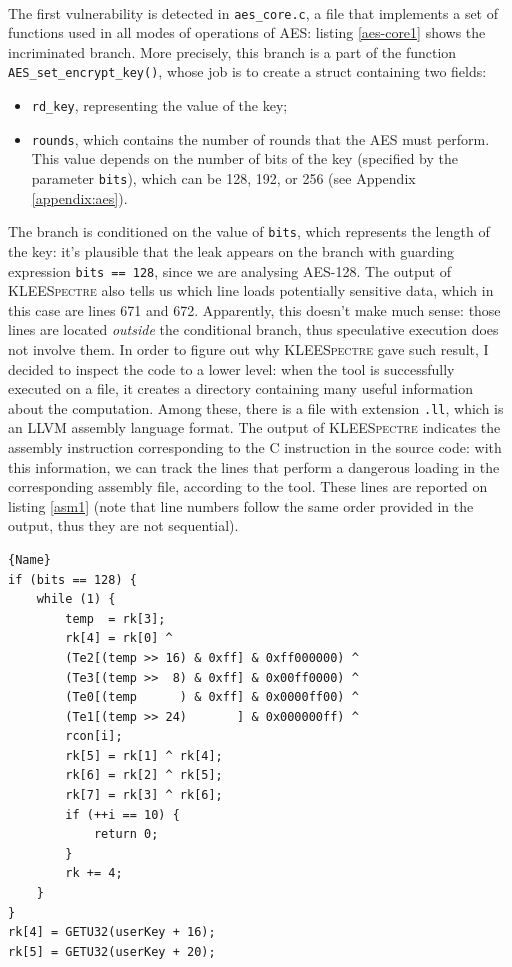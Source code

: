 \documentclass[12pt,a4paper]{book}
\theoremstyle{definition}
\begin{document}
	\paragraph{} The first vulnerability is detected in \texttt{aes\_core.c}, a file that implements a set of functions used in all modes of operations of AES: listing \ref{aes-core1} shows the incriminated branch. More precisely, this branch is a part of the function \texttt{AES\_set\_encrypt\_key()}, whose job is to create a struct containing two fields:
	\begin{itemize}
		\item \texttt{rd\_key}, representing the value of the key;
		\item \texttt{rounds}, which contains the number of rounds that the AES must perform. This value depends on the number of bits of the key (specified by the parameter \texttt{bits}), which can be 128, 192, or 256 (see Appendix \ref{appendix:aes}). 
	\end{itemize}
	The branch is conditioned on the value of \texttt{bits}, which represents the length of the key: it's plausible that the leak appears on the branch with guarding expression \texttt{bits == 128}, since we are analysing AES-128. The output of \textsc{KLEESpectre} also tells us which line loads potentially sensitive data, which in this case are lines 671 and 672. Apparently, this doesn't make much sense: those lines are located \textit{outside} the conditional branch, thus speculative execution does not involve them. In order to figure out why \textsc{KLEESpectre} gave such result, I decided to inspect the code to a lower level: when the tool is successfully executed on a file, it creates a directory containing many useful information about the computation. Among these, there is a file with extension \texttt{.ll}, which is an LLVM assembly language format. The output of \textsc{KLEESpectre} indicates the assembly instruction corresponding to the C instruction in the source code: with this information, we can track the lines that perform a dangerous loading in the corresponding assembly file, according to the tool. These lines are reported on listing \ref{asm1} (note that line numbers follow the same order provided in the output, thus they are not sequential).

	\begin{minipage}{.75\textwidth}
		\begin{lstlisting}[caption=\texttt{aes\_core.c}, firstnumber=653, label=aes-core1]{Name}
if (bits == 128) {
	while (1) {
		temp  = rk[3];
		rk[4] = rk[0] ^
		(Te2[(temp >> 16) & 0xff] & 0xff000000) ^
		(Te3[(temp >>  8) & 0xff] & 0x00ff0000) ^
		(Te0[(temp      ) & 0xff] & 0x0000ff00) ^
		(Te1[(temp >> 24)       ] & 0x000000ff) ^
		rcon[i];
		rk[5] = rk[1] ^ rk[4];
		rk[6] = rk[2] ^ rk[5];
		rk[7] = rk[3] ^ rk[6];
		if (++i == 10) {
			return 0;
		}
		rk += 4;
	}
}
rk[4] = GETU32(userKey + 16);
rk[5] = GETU32(userKey + 20);
		\end{lstlisting}
	\end{minipage}
	\vspace{3mm}
	
\end{document}
